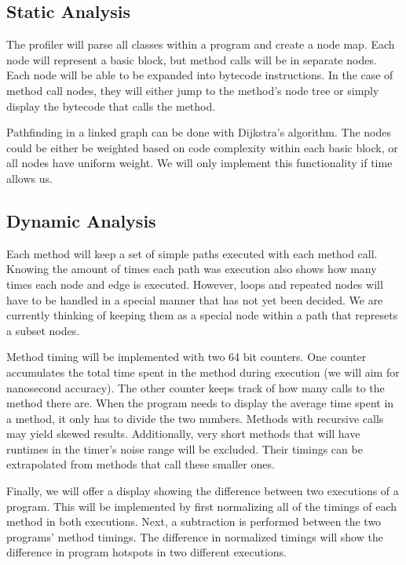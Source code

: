 \documentclass{article}
\begin{document}
\subsection{Static Analysis}

The profiler will parse all classes within a program and create a node map.
Each node will represent a basic block, but method calls will be in separate nodes.
Each node will be able to be expanded into bytecode instructions.
In the case of method call nodes, they will either jump to the method's node tree or simply display the bytecode that calls the method.

Pathfinding in a linked graph can be done with Dijkstra's algorithm.
The nodes could be either be weighted based on code complexity within each basic block, or all nodes have uniform weight.
We will only implement this functionality if time allows us.

\subsection{Dynamic Analysis}

Each method will keep a set of simple paths executed with each method call.
Knowing the amount of times each path was execution also shows how many times each node and edge is executed.
However, loops and repeated nodes will have to be handled in a special manner that has not yet been decided.
We are currently thinking of keeping them as a special node within a path that represets a subset nodes.

Method timing will be implemented with two 64 bit counters.  
One counter accumulates the total time spent in the method during execution (we will aim for nanosecond accuracy).
The other counter keeps track of how many calls to the method there are.
When the program needs to display the average time spent in a method, it only has to divide the two numbers.
Methods with recursive calls may yield skewed results.
Additionally, very short methods that will have runtimes in the timer's noise range will be excluded.
Their timings can be extrapolated from methods that call these smaller ones.

Finally, we will offer a display showing the difference between two executions of a program.
This will be implemented by first normalizing all of the timings of each method in both executions.
Next, a subtraction is performed between the two programs' method timings.
The difference in normalized timings will show the difference in program hotspots in two different executions.
\end{document}
